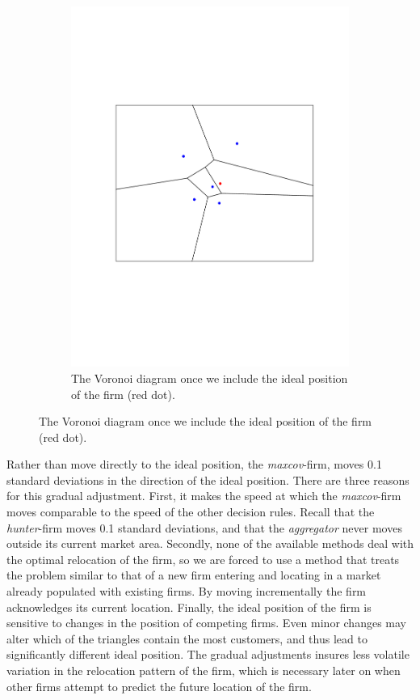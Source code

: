 \documentclass[preprint, 12pt]{elsarticle}
\begin{document}
\begin{figure}
\begin{subfigure}[t]{0.31\textwidth}
		\includegraphics[width=\textwidth, trim={34mm 76mm 28mm 76mm}]{Graphics/maxcov_c_voronoi.pdf}
		\caption{The Voronoi diagram once we include the ideal position of the firm (red dot).}
		\label{fig:maxcov_voronoi_incr}
	\end{subfigure}
	\label{fig:maxcov}
\end{figure}

Rather than move directly to the ideal position, the \emph{maxcov}-firm, moves 0.1 standard deviations in the direction of the ideal position. There are three reasons for this gradual adjustment. First, it makes the speed at which the \emph{maxcov}-firm moves comparable to the speed of the other decision rules. Recall that the \emph{hunter}-firm moves 0.1 standard deviations, and that the \emph{aggregator} never moves outside its current market area. Secondly, none of the available methods deal with the optimal relocation of the firm, so we are forced to use a method that treats the problem similar to that of a new firm entering and locating in a market already populated with existing firms. By moving incrementally the firm acknowledges its current location. Finally, the ideal position of the firm is sensitive to changes in the position of competing firms. Even minor changes may alter which of the triangles contain the most customers, and thus lead to significantly different ideal position. The gradual adjustments insures less volatile variation in the relocation pattern of the firm, which is necessary later on when other firms attempt to predict the future location of the firm.
\end{document}
